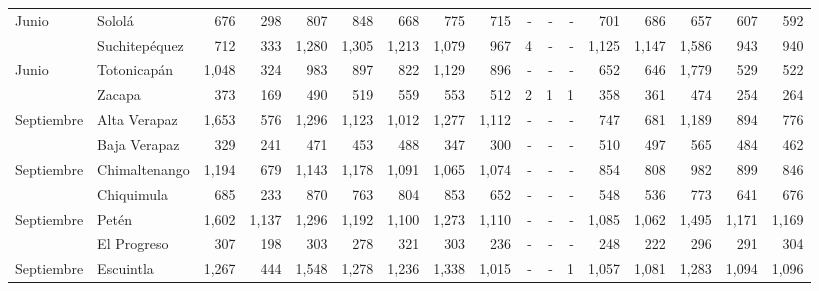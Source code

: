 \begin{landscape}
\begin{center}
\begin{longtable}{llrrrrrrrrrrrrrrr}
			\multicolumn{1}{l}{	\footnotesize	 Junio 	}&	 Sololá 	&	 676 	&	 298 	&	 807 	&	 848 	&	 668 	&	 775 	&	 715 	&	 -   	&	 -   	&	 -   	&	 701 	&	 686 	&	 657 	&	 607 	&	 592 	\\
			\rowcolor{color1!5!white}\multicolumn{1}{l}{	\footnotesize	 Junio 	}&	 Suchitepéquez 	&	 712 	&	 333 	&	 1,280 	&	 1,305 	&	 1,213 	&	 1,079 	&	 967 	&	 4 	&	 -   	&	 -   	&	 1,125 	&	 1,147 	&	 1,586 	&	 943 	&	 940 	\\
			\multicolumn{1}{l}{	\footnotesize	 Junio 	}&	 Totonicapán 	&	 1,048 	&	 324 	&	 983 	&	 897 	&	 822 	&	 1,129 	&	 896 	&	 -   	&	 -   	&	 -   	&	 652 	&	 646 	&	 1,779 	&	 529 	&	 522 	\\
			\rowcolor{color1!5!white}\multicolumn{1}{l}{	\footnotesize	 Junio 	}&	 Zacapa 	&	 373 	&	 169 	&	 490 	&	 519 	&	 559 	&	 553 	&	 512 	&	 2 	&	 1 	&	 1 	&	 358 	&	 361 	&	 474 	&	 254 	&	 264 	\\
			\multicolumn{1}{l}{	\footnotesize	 Septiembre 	}&	 Alta Verapaz 	&	 1,653 	&	 576 	&	 1,296 	&	 1,123 	&	 1,012 	&	 1,277 	&	 1,112 	&	 -   	&	 -   	&	 -   	&	 747 	&	 681 	&	 1,189 	&	 894 	&	 776 	\\
			\rowcolor{color1!5!white}\multicolumn{1}{l}{	\footnotesize	 Septiembre 	}&	 Baja Verapaz 	&	 329 	&	 241 	&	 471 	&	 453 	&	 488 	&	 347 	&	 300 	&	 -   	&	 -   	&	 -   	&	 510 	&	 497 	&	 565 	&	 484 	&	 462 	\\
			\multicolumn{1}{l}{	\footnotesize	 Septiembre 	}&	 Chimaltenango 	&	 1,194 	&	 679 	&	 1,143 	&	 1,178 	&	 1,091 	&	 1,065 	&	 1,074 	&	 -   	&	 -   	&	 -   	&	 854 	&	 808 	&	 982 	&	 899 	&	 846 	\\
			\rowcolor{color1!5!white}\multicolumn{1}{l}{	\footnotesize	 Septiembre 	}&	 Chiquimula 	&	 685 	&	 233 	&	 870 	&	 763 	&	 804 	&	 853 	&	 652 	&	 -   	&	 -   	&	 -   	&	 548 	&	 536 	&	 773 	&	 641 	&	 676 	\\
			\multicolumn{1}{l}{	\footnotesize	 Septiembre 	}&	 Petén 	&	 1,602 	&	 1,137 	&	 1,296 	&	 1,192 	&	 1,100 	&	 1,273 	&	 1,110 	&	 -   	&	 -   	&	 -   	&	 1,085 	&	 1,062 	&	 1,495 	&	 1,171 	&	 1,169 	\\
			\rowcolor{color1!5!white}\multicolumn{1}{l}{	\footnotesize	 Septiembre 	}&	 El Progreso 	&	 307 	&	 198 	&	 303 	&	 278 	&	 321 	&	 303 	&	 236 	&	 -   	&	 -   	&	 -   	&	 248 	&	 222 	&	 296 	&	 291 	&	 304 	\\
			\multicolumn{1}{l}{	\footnotesize	 Septiembre 	}&	 Escuintla 	&	 1,267 	&	 444 	&	 1,548 	&	 1,278 	&	 1,236 	&	 1,338 	&	 1,015 	&	 -   	&	 -   	&	 1 	&	 1,057 	&	 1,081 	&	 1,283 	&	 1,094 	&	 1,096 	\\

\end{longtable}
\end{center}
\end{landscape}
